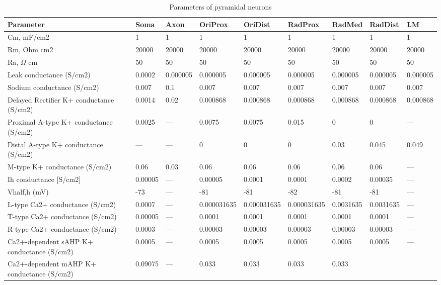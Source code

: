 \documentclass[12pt]{article}
\begin{document}
\begin{table}[h]
	\caption{ Parameters of pyramidal neurons  }
	\label{table:ca1_pyramidal_cell_parameters}
	\begin{center}
		\begin{tabular}{ |p{2cm} | p{1.25cm} |p{1.25cm} |p{1.25cm} |p{1.25cm} |p{1.25cm} |p{1.25cm} |p{1.25cm} |p{1.25cm} | }
			\hline
			\textbf{Parameter} & \textbf{Soma} & \textbf{Axon} & \textbf{OriProx} & \textbf{OriDist} & \textbf{RadProx} & \textbf{RadMed} & \textbf{RadDist} & \textbf{LM} \\ \hline
			Cm, mF/cm2 & 1 & 1 & 1 & 1 & 1 & 1 & 1 & 1 \\ \hline Rm, Ohm cm2 & 20000 & 20000 & 20000 & 20000 & 20000 & 20000 & 20000 & 20000 \\ \hline  Ra, $\Omega$ cm & 50 & 50 & 50 & 50 & 50 & 50 & 50 & 50 \\ \hline Leak conductance (S/cm2) & 0.0002 & 0.000005 & 0.000005 & 0.000005 & 0.000005 & 0.000005 & 0.000005 & 0.000005 \\ \hline  Sodium conductance (S/cm2) & 0.007 & 0.1 & 0.007 & 0.007 & 0.007 & 0.007 & 0.007 & 0.007 \\ \hline  Delayed Rectifier K+ conductance (S/cm2) & 0.0014 & 0.02 & 0.000868 & 0.000868 & 0.000868 & 0.000868 & 0.000868 & 0.000868 \\ \hline  Proximal A-type K+ conductance (S/cm2) & 0.0025 & --- & 0.0075 & 0.0075 & 0.015 & 0 & 0 & --- \\ \hline  Distal A-type K+ conductance (S/cm2) & --- & --- & 0 & 0 & 0 & 0.03 & 0.045 & 0.049 \\ \hline  M-type K+ conductance (S/cm2) & 0.06 & 0.03 & 0.06 & 0.06 & 0.06 & 0.06 & 0.06 & --- \\ \hline  Ih conductance [S/cm2] & 0.00005 & --- & 0.00005 & 0.0001 & 0.0001 &  0.0002 & 0.00035 & --- \\ \hline  Vhalf,h (mV) & -73 & --- & -81 & -81 & -82 & -81 & -81 & --- \\ \hline  L-type Ca2+ conductance (S/cm2) & 0.0007 & --- & 0.000031635 & 0.000031635 & 0.000031635 & 0.0031635 & 0.0031635 & --- \\ \hline  T-type Ca2+ conductance (S/cm2) & 0.00005 & --- & 0.0001 & 0.0001 & 0.0001 & 0.0001 & 0.0001 & --- \\ \hline  R-type Ca2+ conductance (S/cm2) & 0.0003 & --- & 0.00003 & 0.00003 & 0.00003 & 0.00003 & 0.00003 & --- \\ \hline  Ca2+-dependent sAHP  K+ conductance (S/cm2) & 0.0005 & --- & 0.0005 & 0.0005 & 0.0005 & 0.0005 & 0.0005 & --- \\ \hline  Ca2+-dependent mAHP  K+ conductance (S/cm2) & 0.09075 & --- & 0.033 & 0.033 & 0.033 & 0.033 & 
\end{tabular}
\end{center}
\end{table}
\end{document}
